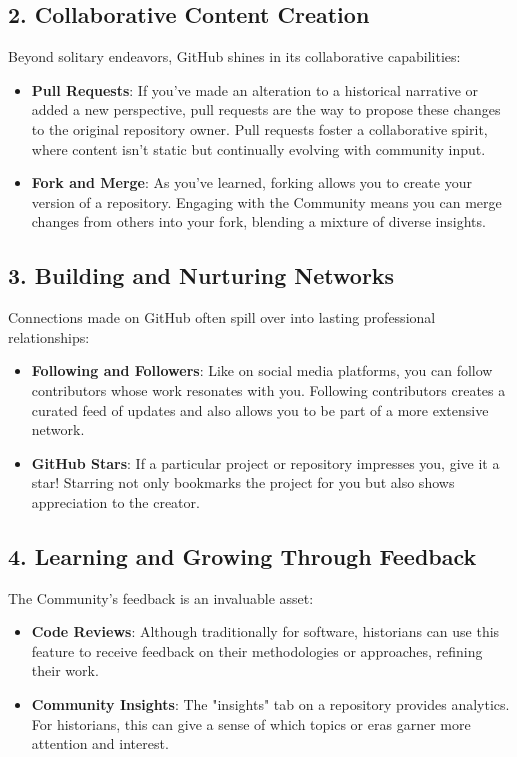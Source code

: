 \documentclass{book}
\begin{document}
\subsection*{2. Collaborative Content Creation}
Beyond solitary endeavors, GitHub shines in its collaborative capabilities:

\begin{itemize}
    \item \textbf{Pull Requests}: If you've made an alteration to a historical narrative or added a new perspective, pull requests are the way to propose these changes to the original repository owner. Pull requests foster a collaborative spirit, where content isn't static but continually evolving with community input.
    \item \textbf{Fork and Merge}: As you've learned, forking allows you to create your version of a repository. Engaging with the Community means you can merge changes from others into your fork, blending a mixture of diverse insights.
\end{itemize}

\subsection*{3. Building and Nurturing Networks}
Connections made on GitHub often spill over into lasting professional relationships:

\begin{itemize}
    \item \textbf{Following and Followers}: Like on social media platforms, you can follow contributors whose work resonates with you. Following contributors creates a curated feed of updates and also allows you to be part of a more extensive network.
    \item \textbf{GitHub Stars}: If a particular project or repository impresses you, give it a star! Starring not only bookmarks the project for you but also shows appreciation to the creator.
\end{itemize}

\subsection*{4. Learning and Growing Through Feedback}
The Community's feedback is an invaluable asset:

\begin{itemize}
    \item \textbf{Code Reviews}: Although traditionally for software, historians can use this feature to receive feedback on their methodologies or approaches, refining their work.
    \item \textbf{Community Insights}: The "insights" tab on a repository provides analytics. For historians, this can give a sense of which topics or eras garner more attention and interest.
\end{itemize}
\end{document}
